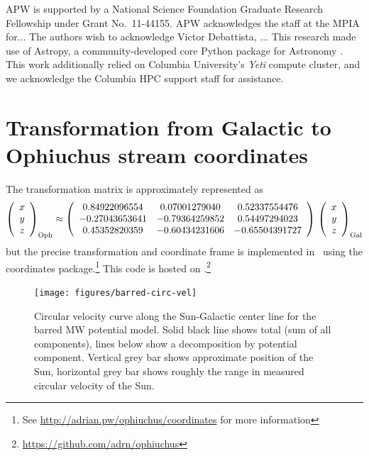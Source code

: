 \documentclass[letterpaper,12pt,preprint]{aastex}
\begin{document}
\acknowledgements
APW is supported by a National Science Foundation Graduate Research Fellowship under Grant No.\ 11-44155.
APW acknowledges the staff at the MPIA for...
The authors wish to acknowledge Victor Debattista, ...
This research made use of Astropy, a community-developed core Python package for Astronomy \citep{astropy13}.
This work additionally relied on Columbia University's \emph{Yeti} compute cluster, and we acknowledge the Columbia HPC support staff for assistance. \\




\appendix
\section{Transformation from Galactic to Ophiuchus stream coordinates} \label{sec:rotationmatrix}
The transformation matrix is approximately represented as
\begin{equation*}
\left( \begin{array}{c}
x \\
y \\
z \end{array} \right)_{\rm Oph} \approx
\left( \begin{array}{ccc}
0.84922096554 & 0.07001279040 & 0.52337554476\\
-0.27043653641 & -0.79364259852 &  0.54497294023\\
0.45352820359 & -0.60434231606 & -0.65504391727
\end{array} \right) \,
\left( \begin{array}{c}
x \\
y \\
z \end{array} \right)_{\rm Gal}
\end{equation*}
but the precise transformation and coordinate frame is implemented in \python\ using the  coordinates package.\footnote{See \url{http://adrian.pw/ophiuchus/coordinates} for more information}  This code is hosted on .\footnote{\url{https://github.com/adrn/ophiuchus}} 

\clearpage
\begin{figure}[p]
\begin{center}
\texttt{[image: figures/barred-circ-vel]}
\caption{Circular velocity curve along the Sun-Galactic center line for the barred MW potential model. Solid black line shows total (sum of all components), lines below show a decomposition by potential component. Vertical grey bar shows approximate position of the Sun, horizontal grey bar shows roughly the range in measured circular velocity of the Sun.}
\label{fig:circ-vel-barred}
\end{center}
\end{figure}
\end{document}
